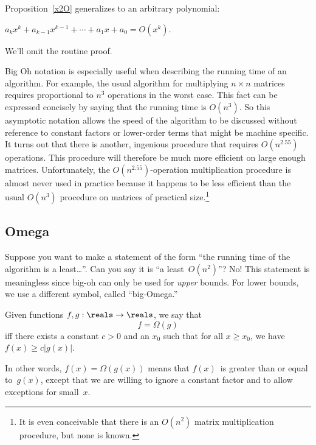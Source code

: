 Proposition~\ref{x2O} generalizes to an arbitrary polynomial:
\begin{proposition}
    $a_k x^k + a_{k-1} x^{k-1} + \cdots + a_1x + a_0 = O(x^k)$.
\end{proposition}
We'll omit the routine proof.

Big Oh notation is especially useful when describing the running time
of an algorithm.  For example, the usual algorithm for multiplying $n
\times n$ matrices requires proportional to $n^3$ operations in the
worst case.  This fact can be expressed concisely by saying that the
running time is $O(n^3)$.  So this asymptotic notation allows the
speed of the algorithm to be discussed without reference to constant
factors or lower-order terms that might be machine specific.  It turns
out that there is another, ingenious 
procedure that requires $O(n^{2.55})$ operations.  This procedure will
therefore be much more efficient on large enough matrices.
Unfortunately, the $O(n^{2.55})$-operation multiplication procedure is
almost never used in practice because it happens to be less efficient
than the usual $O(n^3)$ procedure on matrices of practical
size.\footnote{It is even conceivable that there is an $O(n^2)$ matrix
  multiplication procedure, but none is known.}

\subsection{Omega}

Suppose you want to make a statement of the form ``the running time of
the algorithm is a least\dots''.  Can you say it is ``a
least~$O(n^2)$''?  No!  This statement is meaningless since big-oh can
only be used for \emph{upper} bounds.  For lower bounds, we use a
different symbol, called ``big-Omega.''

\begin{definition}\label{def:Omega}
Given functions $f, g : \reals \to \reals$, we say that
\begin{equation*}
    f = \Omega(g)
\end{equation*}
iff there exists a constant $c > 0$ and an $x_0$ such that for all $x
\ge x_0$, we have $f(x) \ge c |g(x)|$.
\end{definition}

In other words, $f(x) = \Omega(g(x))$ means that $f(x)$~is greater
than or equal to~$g(x)$, except that we are willing to ignore a
constant factor and to allow exceptions for small~$x$.

